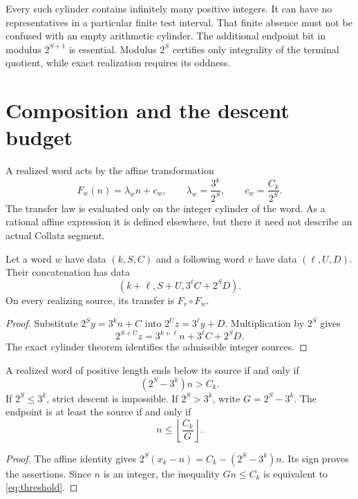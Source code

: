 Every such cylinder contains infinitely many positive integers. It can have no representatives in a particular finite test interval. That finite absence must not be confused with an empty arithmetic cylinder. The additional endpoint bit in modulus $2^{S+1}$ is essential. Modulus $2^S$ certifies only integrality of the terminal quotient, while exact realization requires its oddness.


\section{Composition and the descent budget}
A realized word acts by the affine transformation
\begin{equation}\label{eq:transfer}
F_w(n)=\lambda_w n+c_w,\qquad
\lambda_w=\frac{3^k}{2^S},\qquad c_w=\frac{C_k}{2^S}.
\end{equation}
The transfer law is evaluated only on the integer cylinder of the word. As a rational affine expression it is defined elsewhere, but there it need not describe an actual Collatz segment.

\begin{proposition}[Concatenation]\label{prop:composition}
Let a word $w$ have data $(k,S,C)$ and a following word $v$ have data $(\ell,U,D)$. Their concatenation has data
\begin{equation}\label{eq:composition}
(k+\ell,S+U,3^\ell C+2^S D).
\end{equation}
On every realizing source, its transfer is $F_v\circ F_w$.
\end{proposition}
\begin{proof}
Substitute $2^S y=3^k n+C$ into $2^U z=3^\ell y+D$. Multiplication by $2^S$ gives
\[
2^{S+U}z=3^{k+\ell}n+3^\ell C+2^S D.
\]
The exact cylinder theorem identifies the admissible integer sources.
\end{proof}

\begin{theorem}\label{thm:descent}
A realized word of positive length ends below its source if and only if
\begin{equation}\label{eq:descent}
(2^S-3^k)n>C_k.
\end{equation}
If $2^S\le3^k$, strict descent is impossible. If $2^S>3^k$, write $G=2^S-3^k$. The endpoint is at least the source if and only if
\begin{equation}\label{eq:threshold}
n\le\left\lfloor\frac{C_k}{G}\right\rfloor.
\end{equation}
\end{theorem}
\begin{proof}
The affine identity gives $2^S(x_k-n)=C_k-(2^S-3^k)n$. Its sign proves the assertions. Since $n$ is an integer, the inequality $Gn\le C_k$ is equivalent to \eqref{eq:threshold}.
\end{proof}

